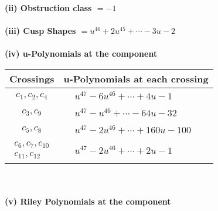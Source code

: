 \documentclass[1p]{elsarticle_modified}
\theoremstyle{definition}
\begin{document}
\flushleft \textbf{(ii) Obstruction class $= -1$}\\~\\
\flushleft \textbf{(iii) Cusp Shapes $= u^{46}+2 u^{45}+\cdots-3 u-2$}\\~\\
\newpage\renewcommand{\arraystretch}{1}
\flushleft \textbf{(iv) u-Polynomials at the component}\newline \\
\begin{tabular}{m{50pt}|m{274pt}}
Crossings & \hspace{64pt}u-Polynomials at each crossing \\
\hline $$\begin{aligned}c_{1},c_{2},c_{4}\end{aligned}$$&$\begin{aligned}
&u^{47}-6 u^{46}+\cdots+4 u-1
\end{aligned}$\\
\hline $$\begin{aligned}c_{3},c_{9}\end{aligned}$$&$\begin{aligned}
&u^{47}- u^{46}+\cdots-64 u-32
\end{aligned}$\\
\hline $$\begin{aligned}c_{5},c_{8}\end{aligned}$$&$\begin{aligned}
&u^{47}-2 u^{46}+\cdots+160 u-100
\end{aligned}$\\
\hline $$\begin{aligned}c_{6},c_{7},c_{10}\\c_{11},c_{12}\end{aligned}$$&$\begin{aligned}
&u^{47}-2 u^{46}+\cdots+2 u-1
\end{aligned}$\\
\hline
\end{tabular}\\~\\
\newpage\renewcommand{\arraystretch}{1}
\flushleft \textbf{(v) Riley Polynomials at the component}\newline \\
\end{document}
